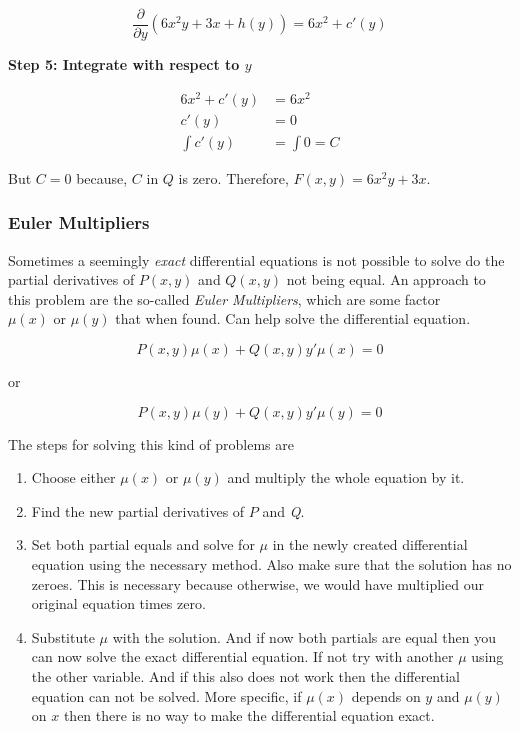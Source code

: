 \[
    \frac{\partial}{\partial y}\left(6x^2y + 3x + h(y)\right) = 6x^2 + c'(y)
\]

\textbf{Step 5: Integrate with respect to \(y\)}

\begin{align*}
    6x^2 + c'(y) &= 6x^2 \\
    c'(y) &= 0 \\
    \int c'(y) &= \int 0 = C
\end{align*}

But \(C = 0\) because, \(C\) in \(Q\) is zero. Therefore, \(F(x,y) = 6x^2y + 3x\).

\subsubsection{Euler Multipliers}

Sometimes a seemingly \emph{exact} differential equations is not possible to solve do the partial 
derivatives of \(P(x,y)\) and \(Q(x,y)\) not being equal. An approach to this problem are the so-called 
\emph{Euler Multipliers}, which are some factor \(\mu(x) \text{ or } \mu(y)\) that when found. Can 
help solve the differential equation.

\[
    P(x,y)\mu(x) + Q(x,y)y'\mu(x) = 0
\]

or 

\[
    P(x,y)\mu(y) + Q(x,y)y'\mu(y) = 0
\]

The steps for solving this kind of problems are

\begin{enumerate}
    
    \item Choose either \(\mu(x)\) or \(\mu(y)\) and multiply the whole equation by it.
    
    \item Find the new partial derivatives of \(P\) and \emph{Q}.
    
    \item Set both partial equals and solve for \(\mu\) in the newly created differential equation 
          using the necessary method. Also make sure that the solution has no zeroes. This is necessary 
          because otherwise, we would have multiplied our original equation times zero.
    
    \item Substitute \(\mu\) with the solution. And if now both partials are equal then you can now 
          solve the exact differential equation. If not try with another \(\mu\) using the other variable.
          And if this also does not work then the differential equation can not be solved. More specific, 
          if \(\mu(x)\) depends on \(y\) and \(\mu(y)\) on \(x\) then there is no way to make the 
          differential equation exact.

\end{enumerate}

